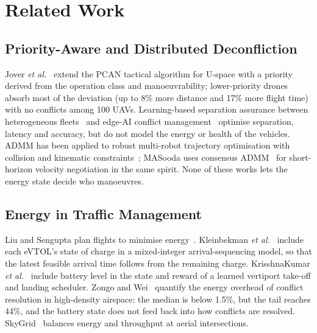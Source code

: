 \documentclass[journal]{IEEEtran}
\begin{document}
\section{Related Work}\label{sec:related}

\subsection{Priority-Aware and Distributed Deconfliction}
Jover \textit{et al.}~\cite{jover2022priority} extend the PCAN tactical algorithm for U-space with a priority derived from the operation class and manoeuvrability; lower-priority drones absorb most of the deviation (up to 8\% more distance and 17\% more flight time) with no conflicts among 100 UAVs. Learning-based separation assurance between heterogeneous fleets~\cite{sharifi2026separation} and edge-AI conflict management~\cite{agnihotri2025swarm} optimise separation, latency and accuracy, but do not model the energy or health of the vehicles. ADMM has been applied to robust multi-robot trajectory optimisation with collision and kinematic constraints~\cite{ni2022admm}; MASooda uses consensus ADMM~\cite{boyd2011admm} for short-horizon velocity negotiation in the same spirit. None of these works lets the energy state decide who manoeuvres.

\subsection{Energy in Traffic Management}
Liu and Sengupta plan flights to minimise energy~\cite{liu2017energy}. Kleinbekman \textit{et al.}~\cite{kleinbekman2018evtol} include each eVTOL's state of charge in a mixed-integer arrival-sequencing model, so that the latest feasible arrival time follows from the remaining charge. KrisshnaKumar \textit{et al.}~\cite{krisshnakumar2023vertiport} include battery level in the state and reward of a learned vertiport take-off and landing scheduler. Zongo and Wei~\cite{zongo2026overhead} quantify the energy overhead of conflict resolution in high-density airspace: the median is below 1.5\%, but the tail reaches 44\%, and the battery state does not feed back into how conflicts are resolved. SkyGrid~\cite{khoshdel2024skygrid} balances energy and throughput at aerial intersections.
\end{document}
